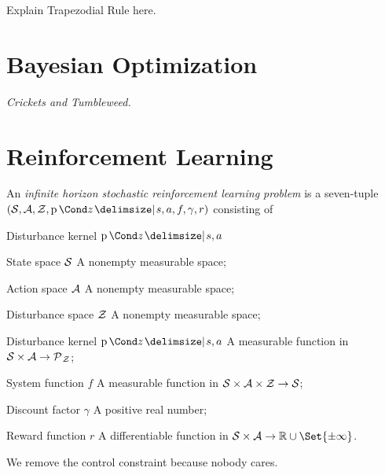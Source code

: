 Explain Trapezodial Rule here.


\section{Bayesian Optimization}
\label{sec:bayesian_optimization}
\emph{Crickets and Tumbleweed.}


\section{Reinforcement Learning}
\label{sec:reinforcement_learning}
\parencite{bertsekas_stochastic_1978}

\begin{definition}
    An \emph{infinite horizon stochastic reinforcement learning problem} is a seven-tuple $(\Sc, \Ac, \Zc, \Prob{z \given s, a}, f, \gamma, r)$ consisting of
    \begin{labeling}{Disturbance kernel $\Prob{z \given s, a}$\quad}
        \item[State space $\mathcal{S}$] A nonempty measurable space;
        \item[Action space $\mathcal{A}$] A nonempty measurable space;
        \item[Disturbance space $\mathcal{Z}$] A nonempty measurable space;
        \item[Disturbance kernel $\Prob{z \given s, a}$] A measurable function in $\mathcal{S} \times \mathcal{A} \to \operatorname{\mathcal{P}\mkern1mu}_{\mathcal{Z}}$;
        \item[System function $f$] A measurable function in  $\mathcal{S} \times \mathcal{A} \times \mathcal{Z} \to \mathcal{S}$;
        \item[Discount factor $\gamma$] A positive real number;
        \item[Reward function $r$] A differentiable function in $\Sc \times \Ac \to \Rb \cup \Set{\pm \infty}$.
    \end{labeling}
\end{definition}
We remove the control constraint because nobody cares.


